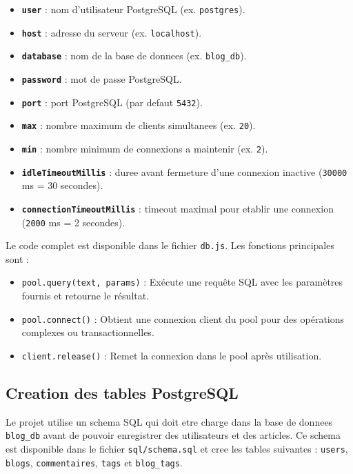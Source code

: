 \documentclass[a4paper,12pt]{book}
\begin{document}
\begin{itemize}
    \item \textbf{\texttt{user}} : nom d'utilisateur PostgreSQL (ex. \texttt{postgres}).
    \item \textbf{\texttt{host}} : adresse du serveur (ex. \texttt{localhost}).
    \item \textbf{\texttt{database}} : nom de la base de donnees (ex. \texttt{blog\_db}).
    \item \textbf{\texttt{password}} : mot de passe PostgreSQL.
    \item \textbf{\texttt{port}} : port PostgreSQL (par defaut \texttt{5432}).
    \item \textbf{\texttt{max}} : nombre maximum de clients simultanees (ex. \texttt{20}).
    \item \textbf{\texttt{min}} : nombre minimum de connexions a maintenir (ex. \texttt{2}).
    \item \textbf{\texttt{idleTimeoutMillis}} : duree avant fermeture d'une connexion inactive (\texttt{30000} ms = 30 secondes).
    \item \textbf{\texttt{connectionTimeoutMillis}} : timeout maximal pour etablir une connexion (\texttt{2000} ms = 2 secondes).
\end{itemize}

Le code complet est disponible dans le fichier \texttt{db.js}. Les fonctions principales sont :

\begin{itemize}
    \item \texttt{pool.query(text, params)} : Exécute une requête SQL avec les paramètres fournis et retourne le résultat.
    \item \texttt{pool.connect()} : Obtient une connexion client du pool pour des opérations complexes ou transactionnelles.
    \item \texttt{client.release()} : Remet la connexion dans le pool après utilisation.
\end{itemize}

\subsection{Creation des tables PostgreSQL}

Le projet utilise un schema SQL qui doit etre charge dans la base de donnees \texttt{blog_db} avant de pouvoir enregistrer des utilisateurs et des articles.
Ce schema est disponible dans le fichier \texttt{sql/schema.sql} et cree les
tables suivantes : \texttt{users}, \texttt{blogs}, \texttt{commentaires},
\texttt{tags} et \texttt{blog_tags}.
\end{document}
